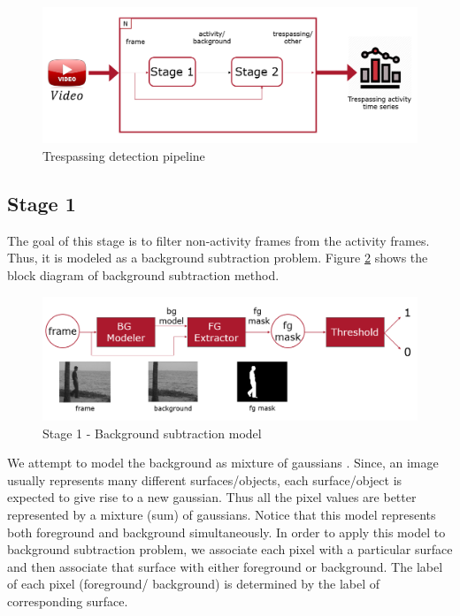 \begin{figure}
    \centering
    \includegraphics[width=\linewidth]{images/trespassing-detection-pipeline.PNG}
    \caption{Trespassing detection pipeline}
    \label{fig:trespassing-detection-pipeline}
\end{figure}


\subsection{Stage 1}
\label{sec:stage1}
The goal of this stage is to filter non-activity frames from the activity frames. Thus, it is modeled as a background subtraction problem. Figure \ref{fig:background-subtraction-model} shows the block diagram of background subtraction method. 
\begin{figure}
    \centering
    \includegraphics[width=\linewidth]{images/background-subtraction-model.PNG}
    \caption{Stage 1 - Background subtraction model}
    \label{fig:background-subtraction-model}
\end{figure}

We attempt to model the background as mixture of gaussians \cite{stauffer1999adaptive,power2002understanding}. Since, an image usually represents many different surfaces/objects, each surface/object is expected to give rise to a new gaussian. Thus all the pixel values are better represented by a mixture (sum) of gaussians. Notice that this model represents both foreground and background simultaneously. In order to apply this model to background subtraction problem, we associate each pixel with a particular surface and then associate that surface with either foreground or background. The label of each pixel (foreground/ background) is determined by the label of corresponding surface. 

